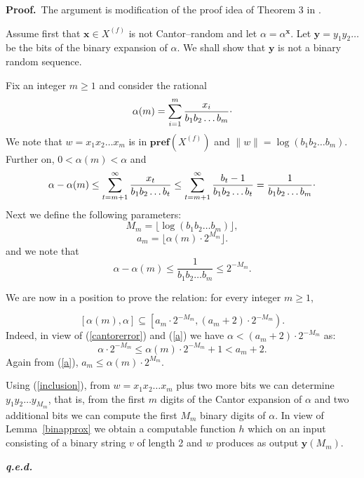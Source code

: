 \documentclass[11pt,a4paper,twoside]{article}
\def \pref#1{{\mathbf{pref}({#1})}}
\newcommand{\x}{{\mathbf x}}
\newcommand{\y}{{\mathbf y}}
\def \XF  {X^{(f)}}
\def \raisedot {\raisebox{.5ex}{.}}
\newenvironment{proof}{\textbf{Proof.\,}}{\hfill\textbf{\itshape
q.e.d.}\par}
\begin{document}
\begin{proof} 
The argument  is modification of the proof idea of Theorem 3 in
\cite{ludwig1}.

 Assume first that $\x \in\XF$ is not Cantor--random and let
$\alpha = \alpha^{\x}$. Let  $\y = y_{1}y_{2}\ldots$ be the bits of the
binary expansion of $\alpha$. We shall show that $\y$ is not a binary random
sequence.

Fix an integer $m\ge 1$ and consider the rational
\[\alpha (m) = \sum_{i=1}^{m} \frac{x_{i}}{b_{1}b_{2}\ldots
b_{m}}\raisedot\]
We note that $w=x_{1}x_{2}\ldots x_{m}$ is in $\pref{\XF}$
and $\parallel w \parallel = \log (b_{1}b_{2}\ldots b_{m})$. Further on,  $0
< \alpha(m) < \alpha$ and
\[\alpha - \alpha(m)   \le  \sum_{t=m+1}^{\infty}
\frac{x_{t}}{b_{1}b_{2}\ldots b_{t}}
  \le  \sum_{t=m+1}^{\infty} \frac{b_{t}-1}{b_{1}b_{2}\ldots b_{t}}
=  \frac{1}{b_{1}b_{2}\ldots b_{m}}\raisedot
\]
 Next we define the following parameters:
 \begin{equation}
\label{M}
M_{m} = \lfloor \log (b_{1}b_{2}\ldots b_{m})\rfloor,
\end{equation}
\begin{equation}
\label{a}
a_{m} = \lfloor \alpha(m)\cdot 2^{M_{m}}  \rfloor.
\end{equation}
and we note that 
\begin{equation}
\label{cantorerror}
 \alpha - \alpha(m) \le \frac{1}{b_{1}b_{2}\ldots b_{m}} \le 2^{-M_{m}}.
 \end{equation}

We are now in a position to  prove the relation: for every integer $m\ge 1$,

\begin{equation}
\label{inclusion}
[\alpha(m), \alpha] \subseteq \left[a_{m}\cdot 2^{-M_{m}}, (a_{m}+2)\cdot
2^{-M_{m}}\right).
\end{equation}
Indeed, in view of (\ref{cantorerror})
and (\ref{a}) we have $\alpha < (a_{m}+2)\cdot 2^{-M_{m}}$ as:
\[\alpha \cdot 2^{-M_{m}} \le \alpha(m) \cdot 2^{-M_{m}} +1 < a_{m} +2. \]
Again from (\ref{a}), $ a_{m} \le \alpha(m)\cdot 2^{M_{m}}$.


Using (\ref{inclusion}),  from $w= x_1 x_2 \ldots x_m$ plus two more bits we
can determine $y_{1} y_{2} \ldots y_{M_{m}}$, that is, from the first $m$
digits of the Cantor expansion of $\alpha$ and two additional bits we can
compute the first $M_{m}$ binary digits of $\alpha$. In view of
Lemma~\ref{binapprox} we obtain
a computable function $h$ which  on  an input consisting of a binary string
$v$ of length 2
and $w$  produces as output $\y (M_{m})$.


\end{proof}
\end{document}
